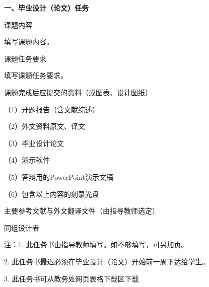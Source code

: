 \documentclass{csustThesis}
\begin{document}
\makeTaskBookCover

\pagestyle{empty}  %

{\noindent{}\bfseries 一、毕业设计（论文）任务}

\begin{ubox}[breakable,]
\noindent 课题内容

填写课题内容。

\vspace*{13\baselineskip}


\end{ubox}

\vspace{-\baselineskip}

\begin{ubox}
\noindent 课题任务要求

填写课题任务要求。

\end{ubox}

\vspace{-\baselineskip}

\begin{ubox}[breakable,]
\noindent   课题完成后应提交的资料（或图表、设计图纸）

（1）开题报告（含文献综述）

（2）外文资料原文、译文

（3）毕业设计论文

（4）演示软件

（5）答辩用的PowerPoint演示文稿

（6）包含以上内容的刻录光盘

\vspace*{3\baselineskip}
\end{ubox}

\vspace{-\baselineskip}

\begin{ubox}[breakable,]
\noindent 主要参考文献与外文翻译文件（由指导教师选定）

\nocite{*}  %
\printbibliography[heading=none]

\vspace*{15\baselineskip}
\end{ubox}

\vspace{-\baselineskip}

\begin{ubox}
\noindent 同组设计者

\vspace*{\baselineskip}
\end{ubox}

\noindent 注：1. 此任务书由指导教师填写。如不够填写，可另加页。

2. 此任务书最迟必须在毕业设计（论文）开始前一周下达给学生。

3. 此任务书可从教务处网页表格下载区下载
\end{document}
